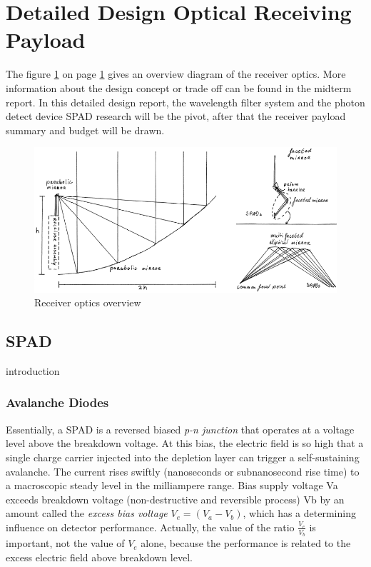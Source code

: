 \section{Detailed Design Optical Receiving Payload}
\label{sec:DDreceiver}
The figure \ref{fig:receiver_overview} on page \ref{fig:receiver_overview} gives an overview diagram of the receiver optics.  More information about the design concept or trade off can be found in the midterm report. In this detailed design report, the wavelength filter system and the photon detect device \acs{SPAD} research will be the pivot, after that the receiver payload summary and budget will be drawn.
\begin{figure}[ht!]
\centering
\includegraphics[scale = 0.5]{chapters/img/DiagramReceiverGeneral.png}
\caption{Receiver optics overview}
\label{fig:receiver_overview}
\end{figure} 

\subsection{\ac{SPAD}}
	\label{SPAD}
introduction

\subsubsection{Avalanche Diodes}
\label{diodes}	
Essentially, a \ac{SPAD} is a reversed biased \textit{p-n junction} that operates at a voltage level above the breakdown voltage. At this bias, the electric field is so high that a single charge carrier injected into the depletion layer can trigger a self-sustaining avalanche. The current rises swiftly (nanoseconds or subnanosecond rise time) to a macroscopic steady level in the milliampere range. Bias supply voltage Va exceeds breakdown voltage (non-destructive and reversible process) Vb by an amount called the \textit{excess bias voltage} $V_e = (V_a - V_b)$, which has a determining influence on detector performance. Actually, the value of the ratio $\frac{V_e}{V_b}$ is important, not the value of $V_e$ alone, because the performance is related to the excess electric field above breakdown level.  

